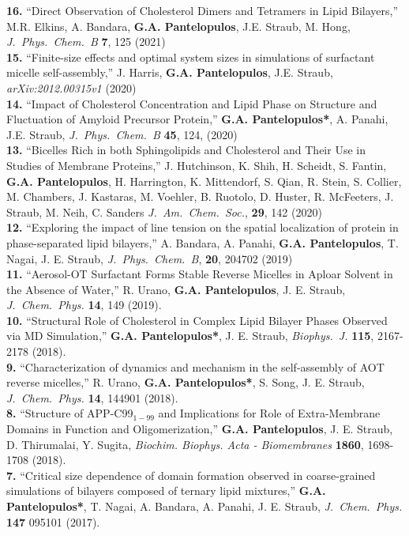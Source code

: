 \documentclass[a4paper]{article}
\def\jpcb{\it J.~Phys.~Chem.~B}
\def\jcp{\it J.~Chem.~Phys.}
\def\jacs{\it J.~Am.~Chem.~Soc.}
\def\bj{\it Biophys.~J.}
\def\jpcb{\it J.~Phys.~Chem.~B}
\begin{document}
{\bf 16.} ``Direct Observation of Cholesterol Dimers and Tetramers in Lipid Bilayers,''  M.R. Elkins, A. Bandara, {\bf G.A. Pantelopulos}, J.E. Straub, M. Hong, {\jpcb} {\bf 7}, 125 (2021)\\
{\bf 15.} ``Finite-size effects and optimal system sizes in simulations of surfactant micelle self-assembly,'' J. Harris, {\bf G.A. Pantelopulos}, J.E. Straub, {\it arXiv:2012.00315v1} (2020)\\
{\bf 14.} ``Impact of Cholesterol Concentration and Lipid Phase on Structure and Fluctuation of Amyloid Precursor Protein,'' \textbf{G.A. Pantelopulos*}, A. Panahi, J.E. Straub, {\jpcb} {\bf 45}, 124, (2020)\\
{\bf 13.} ``Bicelles Rich in both Sphingolipids and Cholesterol and Their Use in Studies of Membrane Proteins,''  J. Hutchinson, K. Shih, H. Scheidt, S. Fantin,  \textbf{G.A. Pantelopulos}, H. Harrington, K. Mittendorf, S. Qian, R. Stein, S. Collier, M. Chambers, J. Kastaras, M. Voehler, B. Ruotolo, D. Huster, R. McFeeters, J. Straub, M. Neih, C. Sanders {\jacs}, {\bf 29}, 142 (2020)\\
{\bf 12.} ``Exploring the impact of line tension on the spatial localization of protein in phase-separated lipid bilayers,''  A. Bandara, A. Panahi, \textbf{G.A. Pantelopulos}, T. Nagai, J. E. Straub, {\jpcb}, {\bf 20}, 204702 (2019)\\
{\bf 11.} ``Aerosol-OT Surfactant Forms Stable Reverse Micelles in Aploar Solvent in the Absence of Water,'' R. Urano, \textbf{G.A. Pantelopulos}, J. E. Straub, {\jcp} {\bf 14}, 149 (2019). \\
{\bf 10.} ``Structural Role of Cholesterol in Complex Lipid Bilayer Phases Observed via MD Simulation,'' \textbf{G.A. Pantelopulos*}, J. E. Straub, {\bj} {\bf 115}, 2167-2178 (2018). \\
{\bf 9.} ``Characterization of dynamics and mechanism in the self-assembly of AOT reverse micelles,'' R. Urano, \textbf{G.A. Pantelopulos*}, S. Song, J. E. Straub, {\jcp} {\bf 14}, 144901 (2018). \\
{\bf 8.} ``Structure of APP-C99$_{1-99}$ and Implications for Role of Extra-Membrane Domains in Function and Oligomerization,'' \textbf{G.A. Pantelopulos}, J. E. Straub, D. Thirumalai, Y. Sugita, \textit{Biochim. Biophys. Acta - Biomembranes} {\bf 1860}, 1698-1708 (2018). \\
{\bf 7.} ``Critical size dependence of domain formation observed in coarse-grained simulations of bilayers composed of ternary lipid mixtures,'' \textbf{G.A. Pantelopulos*}, T. Nagai, A. Bandara, A. Panahi, J. E. Straub, {\jcp} {\bf 147} 095101 (2017). \\
\end{document}
